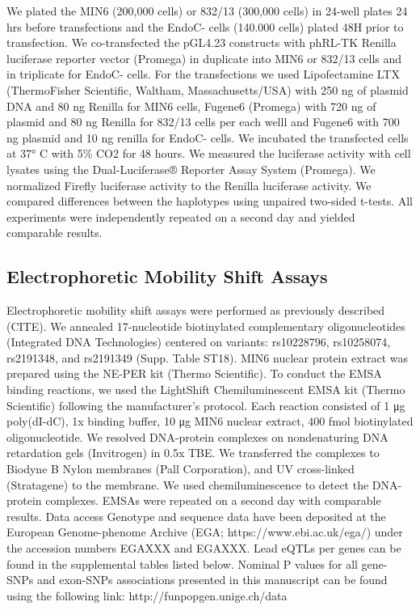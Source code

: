 We plated the MIN6 (200,000 cells) or 832/13 (300,000 cells) in 24-well plates 24 hrs before transfections and the EndoC- cells (140.000 cells) plated 48H prior to transfection. We co-transfected the pGL4.23 constructs with phRL-TK Renilla luciferase reporter vector (Promega) in duplicate into MIN6 or 832/13 cells and in triplicate for EndoC- cells. For the transfections we used Lipofectamine LTX (ThermoFisher Scientific, Waltham, Massachusetts/USA) with 250 ng of plasmid DNA and 80 ng Renilla for MIN6 cells, Fugene6 (Promega) with 720 ng of plasmid and 80 ng Renilla for 832/13 cells per each welll and Fugene6 with 700 ng plasmid and 10 ng renilla for EndoC- cells. We incubated the transfected cells at 37° C with 5\% CO2 for 48 hours. We measured the luciferase activity with cell lysates using the Dual-Luciferase® Reporter Assay System (Promega). We normalized Firefly luciferase activity to the Renilla luciferase activity. We compared differences between the haplotypes using unpaired two-sided t-tests. All experiments were independently repeated on a second day and yielded comparable results.

\subsection{Electrophoretic Mobility Shift Assays}
Electrophoretic mobility shift assays were performed as previously described (CITE). We annealed 17-nucleotide biotinylated complementary oligonucleotides (Integrated DNA Technologies) centered on variants: rs10228796, rs10258074, rs2191348, and rs2191349 (Supp. Table ST18). MIN6 nuclear protein extract was prepared using the NE-PER kit (Thermo Scientific). To conduct the EMSA binding reactions, we used the LightShift Chemiluminescent EMSA kit (Thermo Scientific) following the manufacturer’s protocol. Each reaction consisted of 1 μg poly(dI-dC), 1x binding buffer, 10 μg MIN6 nuclear extract, 400 fmol biotinylated oligonucleotide. We resolved DNA-protein complexes on nondenaturing DNA retardation gels (Invitrogen) in 0.5x TBE. We transferred the complexes to Biodyne B Nylon membranes (Pall Corporation), and UV cross-linked (Stratagene) to the membrane. We used chemiluminescence to detect the DNA-protein complexes. EMSAs were repeated on a second day with comparable results.
Data access
Genotype and sequence data have been deposited at the European Genome-phenome Archive (EGA; https://www.ebi.ac.uk/ega/) under the accession numbers EGAXXX and EGAXXX. 
Lead eQTLs per genes can be found in the supplemental tables listed below. Nominal P values for all gene-SNPs and exon-SNPs associations presented in this manuscript can be found using the following link: http://funpopgen.unige.ch/data 


